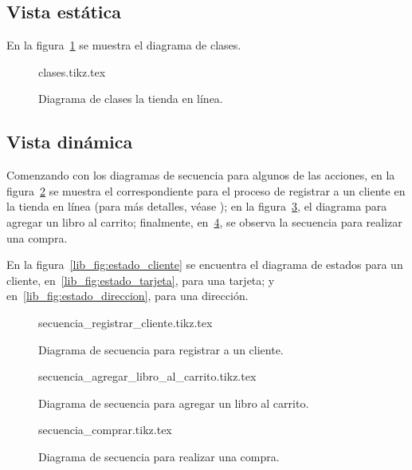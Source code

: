 \subsection{Vista estática}
En la figura~\ref{lib_fig:clases} se muestra el diagrama de clases.

\begin{figure}
  \begin{center}
    {clases.tikz.tex}
    \caption{Diagrama de clases la tienda en línea.}
    \label{lib_fig:clases}
  \end{center}
\end{figure}

\subsection{Vista dinámica}
Comenzando con los diagramas de secuencia para algunos de las acciones, en la
figura~\ref{lib_fig:secuencia_registrar_cliente} se muestra el correspondiente
para el proceso de registrar a un cliente en la tienda en línea (para más
detalles, véase ); en la
figura~\ref{lib_fig:secuencia_agregar_libro_al_carrito}, el diagrama para
agregar un libro al carrito; finalmente, en~\ref{lib_fig:secuencia_comprar},
se observa la secuencia para realizar una compra.

En la figura~\ref{lib_fig:estado_cliente} se encuentra el diagrama de estados
para un cliente, en~\ref{lib_fig:estado_tarjeta}, para una tarjeta; y
en~\ref{lib_fig:estado_direccion}, para una dirección.

\begin{figure}
  \begin{center}
    {secuencia_registrar_cliente.tikz.tex}
    \caption{Diagrama de secuencia para registrar a un cliente.}
    \label{lib_fig:secuencia_registrar_cliente}
  \end{center}
\end{figure}

\begin{figure}
  \begin{center}
    {secuencia_agregar_libro_al_carrito.tikz.tex}
    \caption{Diagrama de secuencia para agregar un libro al carrito.}
    \label{lib_fig:secuencia_agregar_libro_al_carrito}
  \end{center}
\end{figure}

\begin{figure}
  \begin{center}
    {secuencia_comprar.tikz.tex}
    \caption{Diagrama de secuencia para realizar una compra.}
    \label{lib_fig:secuencia_comprar}
  \end{center}
\end{figure}

